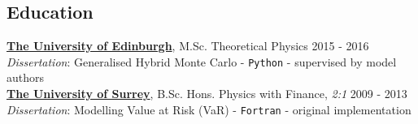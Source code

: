 \documentclass[margin, line]{res}
\newcommand{\EdPS}{http://www.drps.ed.ac.uk/15-16/dpt/cxpgph11085.htm}
\newcommand{\EdSym}{http://www.drps.ed.ac.uk/15-16/dpt/cxpgph11097.htm}
\newcommand{\EdSMod}{http://www.drps.ed.ac.uk/15-16/dpt/cxmath11029.htm}
\newcommand{\EdQT}{http://www.drps.ed.ac.uk/15-16/dpt/cxphys11019.htm}
\newcommand{\EdPP}{http://www.drps.ed.ac.uk/15-16/dpt/cxphys11042.htm}
\newcommand{\EdMQFT}{http://www.drps.ed.ac.uk/15-16/dpt/cxpgph11094.htm}
\newcommand{\UoS}{http://www.surrey.ac.uk/physics/}
\newcommand{\UoE}{https://higgs.ph.ed.ac.uk}
\newenvironment{list1}{
	\begin{list}{\ding{113}}{%
		\setlength{\itemsep}{0in}
		\setlength{\parsep}{0in} \setlength{\parskip}{0in}
		\setlength{\topsep}{0in} \setlength{\partopsep}{0in}
		\setlength{\leftmargin}{0.17in}}}{\end{list}}
\begin{document}
\begin{resume}
\section{\sc Education}
{\bf \href{\UoE}{The University of Edinburgh}}, M.Sc. Theoretical Physics \hfill {2015 - 2016}
\\
    \vspace*{-.15in} %
    \vspace{-.3cm} %
    \emph{Dissertation}: Generalised Hybrid Monte Carlo - \verb|Python| -
             supervised by model authors\\

{\bf \href{\UoS}{The University of Surrey}}, B.Sc. Hons. Physics with Finance, \textit{2:1}
\hfill {2009 - 2013}
\\
	\vspace*{-.15in}
    \emph{Dissertation}: Modelling Value at Risk (VaR) %
                - \verb|Fortran| - original implementation



\end{resume}
\end{document}
